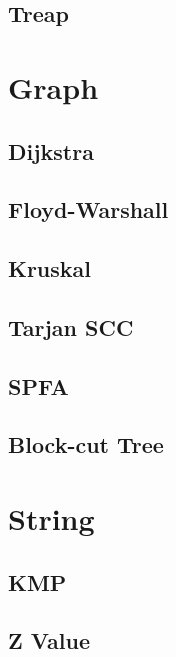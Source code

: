 \documentclass[twocolumn]{article}
\begin{document}
\subsection{Treap}


\section{Graph}

\subsection{Dijkstra}


\subsection{Floyd-Warshall}


\subsection{Kruskal}


\subsection{Tarjan SCC}


\subsection{SPFA}


\subsection{Block-cut Tree}


\section{String}

\subsection{KMP}


\subsection{Z Value}

\end{document}
